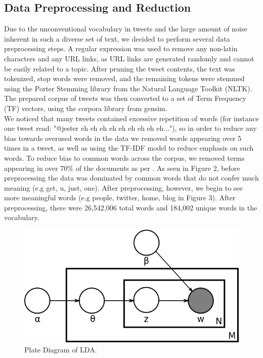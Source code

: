 \documentclass{acm_proc_article-sp}
\begin{document}
\subsection{Data Preprocessing and Reduction}
\hspace*{5mm}Due to the unconventional vocabulary in tweets and the large amount of noise inherent in such a diverse set of text, we decided to perform several data preprocessing steps. A regular expression was used to remove any non-latin characters and any URL links, as URL links are generated randomly and cannot be easily related to a topic. After pruning the tweet contents, the text was tokenized, stop words were removed, and the remaining tokens were stemmed using the Porter Stemming library from the Natural Language Toolkit (NLTK). The prepared corpus of tweets was then converted to a set of Term Frequency (TF) vectors, using the corpora library from gensim. \\
We noticed that many tweets contained excessive repetition of words (for instance one tweet read: "@jester eh eh eh eh eh eh eh eh eh..."), so in order to reduce any bias towards overused words in the data we removed words appearing over 5 times in a tweet, as well as using the TF-IDF model to reduce emphasis on such words. To reduce bias to common words across the corpus, we removed terms appearing in over 70\% of the documents as per \cite{zhao2011comparing}. As seen in Figure 2, before preprocessing the data was dominated by common words that do not confer much meaning (e.g get, u, just, one). After preprocessing, however, we begin to see more meaningful words (e.g people, twitter, home, blog in Figure 3). After preprocessing, there were 26,542,006 total words and 184,002 unique words in the vocabulary.\\


\begin{figure}[ht]
\includegraphics[scale=0.4]{figs/LDA}
\caption{Plate Diagram of LDA.}
\label{fig:platelda}
\end{figure}
\end{document}
